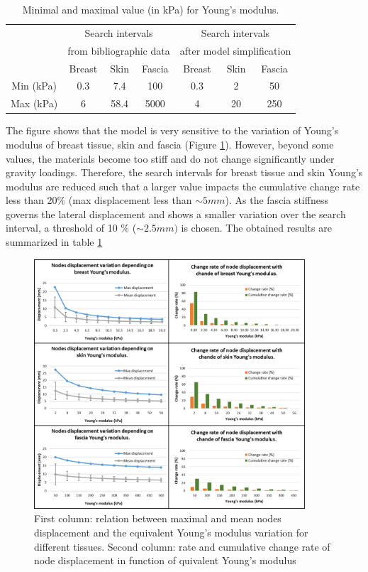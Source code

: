 \begin{table}[!h]
\centering
\begin{tabular}{|c||c|c|c||c|c|c|}
\hline
&\multicolumn{3}{|c||}{Search intervals}& \multicolumn{3}{c|}{Search intervals}\\
&\multicolumn{3}{|c||}{ from bibliographic data}& \multicolumn{3}{c|}{ after model simplification}\\
\hline
\hline
& Breast & Skin & Fascia & Breast & Skin & Fascia \\
\hline
Min (kPa)  & 0.3 & 7.4 & 100 & 0.3 & 2 & 50\\
\hline
Max (kPa) & 6 & 58.4 & 5000& 4& 20 &250 \\
\hline
\end{tabular}
\caption{Minimal and maximal value (in kPa) for Young’s modulus.}
\label{table:minandmaxelasticmodulus}
\end{table}

The figure shows that the model is very sensitive to the variation of Young’s modulus of breast tissue, skin and fascia (Figure \ref{fig:materialPropDiscretization}). However, beyond some values, the materials become too stiff and do not change significantly under gravity loadings.  Therefore, the search intervals for breast tissue and skin Young’s modulus are reduced such that a larger value impacts the cumulative change rate less than 20\% (max displacement less than $\sim 5mm$). As the fascia stiffness governs the lateral displacement and shows a smaller variation over the search interval, a threshold of 10 \% ($\sim 2.5mm)$ is chosen. The obtained results are summarized in table \ref{table:minandmaxelasticmodulus} 

\begin{figure}[!h]
\centering
\includegraphics[width=0.9\textwidth,keepaspectratio]{figures/materialPropDiscretization.png} 
\caption{First column: relation between maximal and mean nodes displacement and the equivalent Young's modulus variation for different tissues. Second column: rate and cumulative change rate of node displacement in function of quivalent Young's modulus}\label{fig:materialPropDiscretization}
\end{figure}

